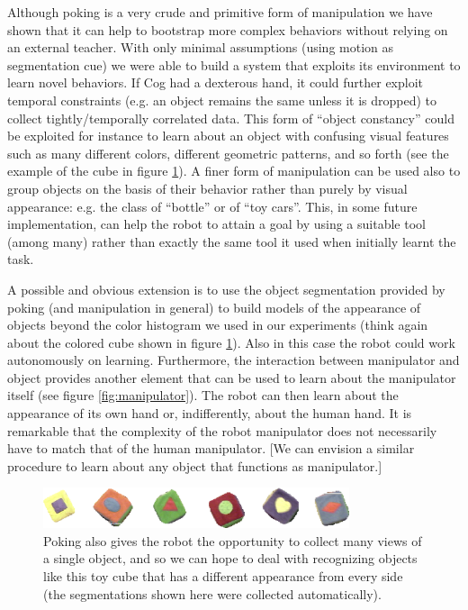 Although poking is a very crude and primitive form of manipulation we have
shown that it can help to bootstrap more complex behaviors without relying on 
an external teacher. With only minimal assumptions (using motion as segmentation
cue) we were able to build a system that exploits its environment to 
learn novel behaviors. If Cog had a dexterous hand, it could further
exploit temporal constraints (e.g. an object remains the same unless it is dropped)
to collect tightly/temporally correlated data. This form of ``object constancy'' could be 
exploited for instance to learn about an object with confusing visual features such
as many different colors, different geometric patterns, and so forth  
(see the example of the cube in figure \ref{fig:sample-results}). A finer form of manipulation can be
used also to group objects on the basis of their behavior rather than purely
by visual appearance: e.g. the class of ``bottle'' or of ``toy cars''.
This, in some future implementation, can help the robot to attain a goal by using
a suitable tool (among many) rather than exactly the same tool it used
when initially learnt the task.

A possible and obvious extension is to use the object segmentation provided 
by poking (and manipulation in general) to build models of the appearance of objects 
beyond the color histogram we used in our experiments (think again about the
colored cube shown in figure \ref{fig:sample-results}).
Also in this case the robot could work autonomously on learning. Furthermore, the
interaction between manipulator and object provides another element that can
be used to learn about the manipulator itself (see figure \ref{fig:manipulator}). 
The robot can then learn about the appearance of its own hand or, 
indifferently, about the human hand. It is 
remarkable that the complexity of the robot manipulator does not necessarily have to
match that of the human manipulator. [We can envision a similar procedure to learn about 
any object that functions as manipulator.]

\begin{figure}[tbh]
  \centerline{\includegraphics[width=9cm]{fig-cube-segmentations}}
  \caption{
%
Poking also gives the robot the opportunity
to collect many views of a single object, and so we can hope to deal
with recognizing objects like this toy cube
that has a different appearance from every side (the segmentations
shown here were collected automatically).
%
}
  \label{fig:sample-results}
\end{figure}







